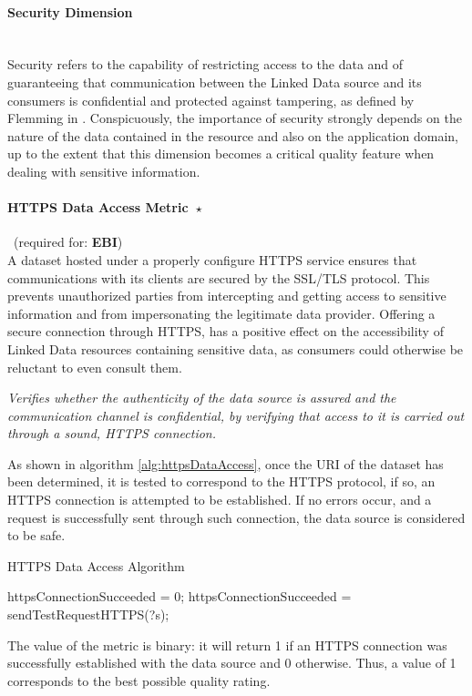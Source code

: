 

\paragraph{Security Dimension}~\\ %
Security refers to the capability of restricting access to the data and of guaranteeing that communication between the Linked Data source and its consumers is confidential and protected against tampering, as defined by Flemming in \cite{Flemming2008}. Conspicuously, the importance of security strongly depends on the nature of the data contained in the resource and also on the application domain, up to the extent that this dimension becomes a critical quality feature when dealing with sensitive information.


\paragraph{HTTPS Data Access Metric~$\star$}~(required for: \textbf{EBI}) ~\\ %
A dataset hosted under a properly configure HTTPS service ensures that communications with its clients are secured by the SSL/TLS protocol. This prevents unauthorized parties from intercepting and getting access to sensitive information and from impersonating the legitimate data provider. Offering a secure connection through HTTPS, has a positive effect on the accessibility of Linked Data resources containing sensitive data, as consumers could otherwise be reluctant to even consult them.

\begin{mdframed}[style=metricdefinition]
\emph{Verifies whether the authenticity of the data source is assured and the communication channel is confidential, by verifying that access to it is carried out through a sound, HTTPS connection.}
\end{mdframed}

As shown in algorithm \ref{alg:httpsDataAccess}, once the URI of the dataset has been determined, it is tested to correspond to the HTTPS protocol, if so, an HTTPS connection is attempted to be established. If no errors occur, and a request is successfully sent through such connection, the data source is considered to be safe.
\begin{algorithm}
\caption{HTTPS Data Access Algorithm} \label{alg:httpsDataAccess}
\begin{algorithmic}[1]
\State httpsConnectionSucceeded = 0;
\EndProcedure
{}
\State httpsConnectionSucceeded = sendTestRequestHTTPS(?s);
\EndIf
{}
\EndProcedure
\end{algorithmic}
\end{algorithm}
The value of the metric is binary: it will return 1 if an HTTPS connection was successfully established with the data source and 0 otherwise. Thus, a value of 1 corresponds to the best possible quality rating.

